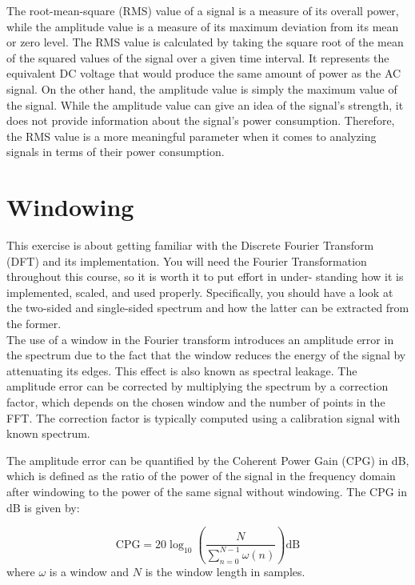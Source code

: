 \documentclass[
	a4paper,
	11pt,
]{article}
\begin{document}
The root-mean-square (RMS) value of a signal is a measure of its overall power, while the amplitude value is a measure of its maximum deviation from its mean or zero level. The RMS value is calculated by taking the square root of the mean of the squared values of the signal over a given time interval. It represents the equivalent DC voltage that would produce the same amount of power as the AC signal. On the other hand, the amplitude value is simply the maximum value of the signal. While the amplitude value can give an idea of the signal's strength, it does not provide information about the signal's power consumption. Therefore, the RMS value is a more meaningful parameter when it comes to analyzing signals in terms of their power consumption.




\section{Windowing}
This exercise is about getting familiar with the Discrete Fourier Transform (DFT) and its implementation. You will need the Fourier Transformation throughout this course, so it is worth it to put effort in under- standing how it is implemented, scaled, and used properly. Specifically, you should have a look at the two-sided and single-sided spectrum and how the latter can be extracted from the former.
\\
The use of a window in the Fourier transform introduces an amplitude error in the spectrum due to the fact that the window reduces the energy of the signal by attenuating its edges. This effect is also known as spectral leakage. The amplitude error can be corrected by multiplying the spectrum by a correction factor, which depends on the chosen window and the number of points in the FFT. The correction factor is typically computed using a calibration signal with known spectrum.

The amplitude error can be quantified by the Coherent Power Gain (CPG) in dB, which is defined as the ratio of the power of the signal in the frequency domain after windowing to the power of the same signal without windowing. The CPG in dB is given by:


\begin{equation}
\text{CPG} = 20\log_{10} \left(\frac{N}{\sum^{N-1}_{n=0} \omega (n)}\right) \text{dB}
\end{equation}
where \(\omega\) is a window and \(N\) is the window length in samples.
\\
\\
\end{document}

